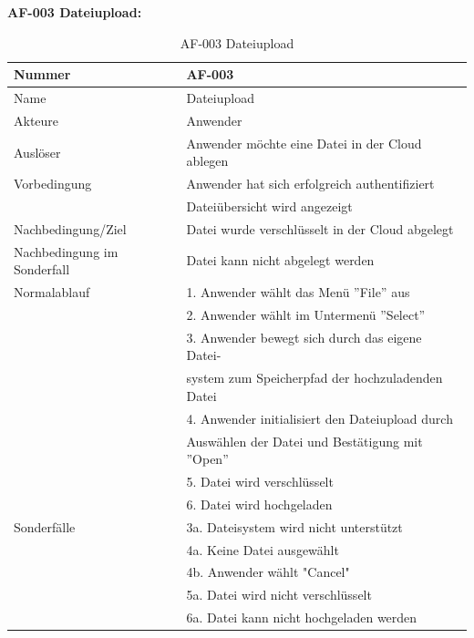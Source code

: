 \documentclass[12pt,a4paper,bibliography=totocnumbered,listof=totocnumbered]{scrartcl}
\begin{document}
\textbf{AF-003 Dateiupload:}
\begin{table}[!h]
	\centering
	\begin{tabular}{|l|l|}
		\hline
		Nummer & AF-003\\
		\hline
		Name & Dateiupload\\
		\hline
		Akteure & Anwender\\
		\hline
		Auslöser & Anwender möchte eine Datei in der Cloud ablegen\\
		\hline
		Vorbedingung & Anwender hat sich erfolgreich authentifiziert \\ & Dateiübersicht wird angezeigt\\
		\hline
		Nachbedingung/Ziel & Datei wurde verschlüsselt in der Cloud abgelegt \\
		\hline
		Nachbedingung im Sonderfall & Datei kann nicht abgelegt werden\\
		\hline
		Normalablauf & 1. Anwender wählt das Menü ''File'' aus \\ & 2. Anwender wählt im Untermenü ''Select'' \\ & 3. Anwender bewegt sich durch das eigene  Datei- \\ & system zum Speicherpfad der hochzuladenden Datei \\ & 4. Anwender initialisiert den Dateiupload durch \\ &  Auswählen der Datei und Bestätigung mit ''Open'' \\  & 5. Datei wird verschlüsselt \\ & 6. Datei wird hochgeladen \\
		\hline
		Sonderfälle & 3a. Dateisystem wird nicht unterstützt \\& 4a. Keine Datei ausgewählt \\ & 4b. Anwender wählt "Cancel" \\ &  5a. Datei wird nicht verschlüsselt \\ & 6a. Datei kann nicht hochgeladen werden\\
		\hline
	\end{tabular}
	\caption{AF-003 Dateiupload}
	\label{tab:AF-003 Dateiupload}
\end{table}
\pagebreak
\end{document}
